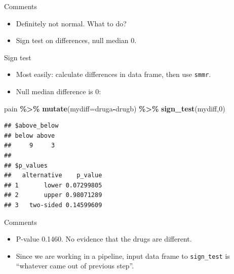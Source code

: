 \documentclass[
  ignorenonframetext,
]{beamer}
\newenvironment{Shaded}{\begin{snugshade}}{\end{snugshade}}
\newcommand{\DataTypeTok}[1]{\textcolor[rgb]{0.13,0.29,0.53}{#1}}
\newcommand{\DecValTok}[1]{\textcolor[rgb]{0.00,0.00,0.81}{#1}}
\newcommand{\KeywordTok}[1]{\textcolor[rgb]{0.13,0.29,0.53}{\textbf{#1}}}
\newcommand{\NormalTok}[1]{#1}
\newcommand{\OperatorTok}[1]{\textcolor[rgb]{0.81,0.36,0.00}{\textbf{#1}}}
\newcommand{\StringTok}[1]{\textcolor[rgb]{0.31,0.60,0.02}{#1}}
\providecommand{\tightlist}{%
  \setlength{\itemsep}{0pt}\setlength{\parskip}{0pt}}
\begin{document}
\begin{frame}{Comments}
\protect\hypertarget{comments}{}
\begin{itemize}
\tightlist
\item
  Definitely not normal. What to do?
\item
  Sign test on differences, null median 0.
\end{itemize}
\end{frame}

\begin{frame}[fragile]{Sign test}
\protect\hypertarget{sign-test}{}
\begin{itemize}
\tightlist
\item
  Most easily: calculate differences in data frame, then use
  \texttt{smmr}.
\item
  Null median difference is 0:
\end{itemize}

\begin{Shaded}
\begin{Highlighting}[]
\NormalTok{pain }\OperatorTok{\%\textgreater{}\%}\StringTok{ }\KeywordTok{mutate}\NormalTok{(}\DataTypeTok{mydiff=}\NormalTok{druga}\OperatorTok{{-}}\NormalTok{drugb) }\OperatorTok{\%\textgreater{}\%}
\KeywordTok{sign\_test}\NormalTok{(mydiff,}\DecValTok{0}\NormalTok{)}
\end{Highlighting}
\end{Shaded}

\begin{verbatim}
## $above_below
## below above 
##     9     3 
## 
## $p_values
##   alternative    p_value
## 1       lower 0.07299805
## 2       upper 0.98071289
## 3   two-sided 0.14599609
\end{verbatim}
\end{frame}

\begin{frame}[fragile]{Comments}
\protect\hypertarget{comments-1}{}
\begin{itemize}
\tightlist
\item
  P-value 0.1460. No evidence that the drugs are different.
\item
  Since we are working in a pipeline, input data frame to
  \texttt{sign\_test} is ``whatever came out of previous step''.
\end{itemize}
\end{frame}
\end{document}
